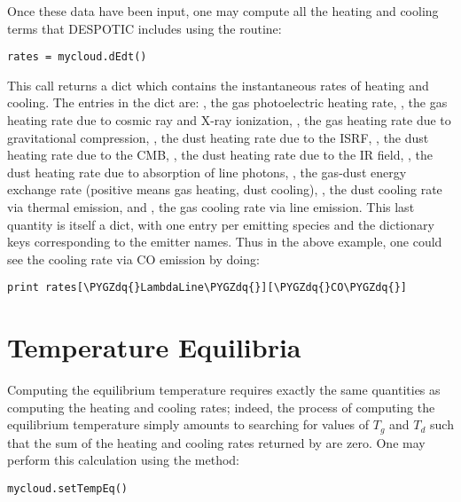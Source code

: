 \documentclass[letterpaper,10pt,english]{sphinxmanual}
\def\PYGZdq{\char`\"}
\begin{document}
Once these data have been input, one may compute all the heating and
cooling terms that DESPOTIC includes using the  routine:

\begin{Verbatim}[commandchars=\\\{\}]
rates = mycloud.dEdt()
\end{Verbatim}

This call returns a dict which contains the instantaneous rates of
heating and cooling. The entries in the dict are: , the gas
photoelectric heating rate, , the gas heating rate due to
cosmic ray and X-ray ionization, , the gas heating rate due
to gravitational compression, , the dust heating rate
due to the ISRF, , the dust heating rate due to the CMB,
, the dust heating rate due to the IR field,
, the dust heating rate due to absorption of line
photons, , the gas-dust energy exchange rate (positive means
gas heating, dust cooling), , the dust cooling rate via
thermal emission, and , the gas cooling rate via line
emission. This last quantity is itself a dict, with one entry per
emitting species and the dictionary keys corresponding to the emitter
names. Thus in the above example, one could see the cooling rate via
CO emission by doing:

\begin{Verbatim}[commandchars=\\\{\}]
print rates[\PYGZdq{}LambdaLine\PYGZdq{}][\PYGZdq{}CO\PYGZdq{}]
\end{Verbatim}


\section{Temperature Equilibria}
\label{functions:ssec-temp-eq}\label{functions:temperature-equilibria}
Computing the equilibrium temperature requires exactly the same
quantities as computing the heating and cooling rates; indeed, the
process of computing the equilibrium temperature simply amounts to
searching for values of \(T_g\) and \(T_d\) such that the sum
of the heating and cooling rates returned by  are zero. One
may perform this calculation using the  method:

\begin{Verbatim}[commandchars=\\\{\}]
mycloud.setTempEq()
\end{Verbatim}
\end{document}

